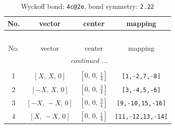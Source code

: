 \documentclass[fleqn,8pt]{jsarticle}
\begin{document}
\renewcommand{\arraystretch}{1.2}
\begin{longtable}{cccc}
\caption{Wyckoff bond: {\tt 4c@2e}, bond symmetry: {\tt 2.22}}
 \\
 \hline \hline
No. & vector & center & mapping \\ \hline \endfirsthead

\multicolumn{3}{l}{\tablename\ \thetable{}} \\
 \hline \hline
No. & vector & center & mapping \\ \hline \endhead

 \hline \hline
\multicolumn{3}{r}{\footnotesize\it continued ...} \\ \endfoot

 \hline \hline
\multicolumn{3}{r}{} \\ \endlastfoot

1 & $\left[ X,\, X,\, 0 \right]$ & $\left[ 0,\, 0,\, \frac{1}{4} \right]$ & {\tt [1,-2,7,-8]} \\ \hline
2 & $\left[ - X,\, X,\, 0 \right]$ & $\left[ 0,\, 0,\, \frac{3}{4} \right]$ & {\tt [3,-4,5,-6]} \\ \hline
3 & $\left[ - X,\, - X,\, 0 \right]$ & $\left[ 0,\, 0,\, \frac{3}{4} \right]$ & {\tt [9,-10,15,-16]} \\ \hline
4 & $\left[ X,\, - X,\, 0 \right]$ & $\left[ 0,\, 0,\, \frac{1}{4} \right]$ & {\tt [11,-12,13,-14]} \\
\end{longtable}
\renewcommand{\arraystretch}{1.2}
\end{document}
